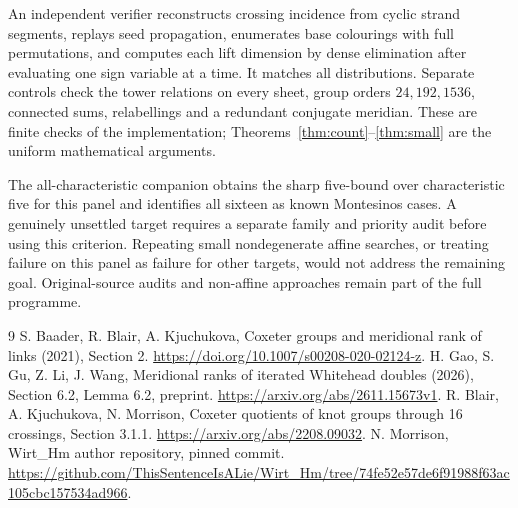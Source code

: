 \documentclass[11pt]{article}
\begin{document}
An independent verifier reconstructs crossing incidence from cyclic
strand segments, replays seed propagation, enumerates base colourings
with full permutations, and computes each lift dimension by dense
elimination after evaluating one sign variable at a time. It matches
all distributions. Separate controls check the tower relations on every
sheet, group orders $24,192,1536$, connected sums, relabellings and a
redundant conjugate meridian. These are finite checks of the
implementation; Theorems~\ref{thm:count}--\ref{thm:small} are the uniform
mathematical arguments.

The all-characteristic companion obtains the sharp five-bound over
characteristic five for this panel and identifies all sixteen as known
Montesinos cases. A genuinely unsettled target requires a separate
family and priority audit before using this criterion.
Repeating small nondegenerate affine searches, or treating failure on
this panel as failure for other targets, would not address the remaining
goal. Original-source audits and non-affine approaches remain part of
the full programme.

\begin{thebibliography}{9}
 S. Baader, R. Blair, A. Kjuchukova,
Coxeter groups and meridional rank of links (2021), Section 2.
\url{https://doi.org/10.1007/s00208-020-02124-z}.
 H. Gao, S. Gu, Z. Li, J. Wang,
Meridional ranks of iterated Whitehead doubles (2026), Section 6.2,
Lemma 6.2, preprint. \url{https://arxiv.org/abs/2611.15673v1}.
 R. Blair, A. Kjuchukova, N. Morrison,
Coxeter quotients of knot groups through 16 crossings, Section 3.1.1.
\url{https://arxiv.org/abs/2208.09032}.
 N. Morrison, Wirt\_Hm author repository, pinned commit.
\url{https://github.com/ThisSentenceIsALie/Wirt_Hm/tree/74fe52e57de6f91988f63ac105cbc157534ad966}.
\end{thebibliography}
\end{document}
